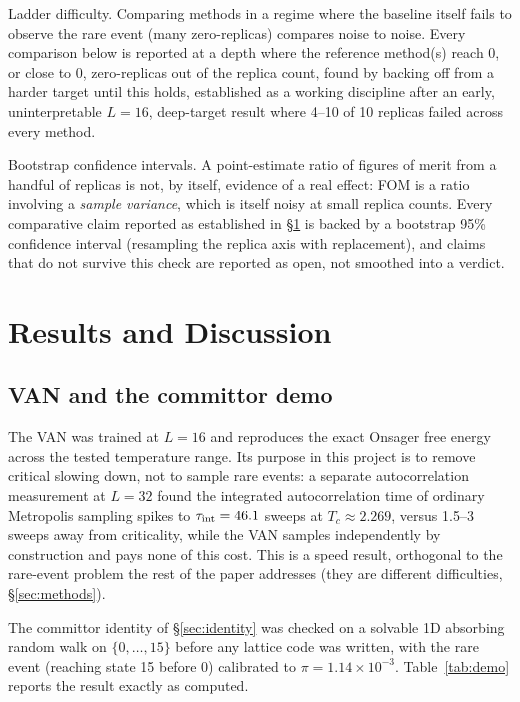 \documentclass[a4paper,fleqn]{cas-sc}
\begin{document}
Ladder difficulty. Comparing methods in a regime where the baseline itself fails
to observe the rare event (many zero-replicas) compares noise to noise. Every comparison
below is reported at a depth where the reference method(s) reach 0, or close to 0,
zero-replicas out of the replica count, found by backing off from a harder target until
this holds, established as a working discipline after an early, uninterpretable
$L=16$, deep-target result where 4--10 of 10 replicas failed across every method.

Bootstrap confidence intervals. A point-estimate ratio of figures of merit from a
handful of replicas is not, by itself, evidence of a real effect: FOM is a ratio
involving a \emph{sample variance}, which is itself noisy at small replica counts. Every
comparative claim reported as established in \S\ref{sec:results} is backed by a bootstrap
95\% confidence interval (resampling the replica axis with replacement), and claims that do
not survive this check are reported as open, not smoothed into a verdict.

\FloatBarrier

\section{Results and Discussion}\label{sec:results}

\subsection{VAN and the committor demo}\label{sec:res-van}
The VAN was trained at $L=16$ and reproduces the exact Onsager free energy across the
tested temperature range. Its purpose in this project is to remove critical slowing down,
not to sample rare events: a separate autocorrelation measurement at $L=32$ found the
integrated autocorrelation time of ordinary Metropolis sampling spikes to $\tau_{\rm
	int}=46.1$ sweeps at $T_c\approx2.269$, versus 1.5--3 sweeps away from criticality, while
the VAN samples independently by construction and pays none of this cost. This is a speed
result, orthogonal to the rare-event problem the rest of the paper addresses (they are
different difficulties, \S\ref{sec:methods}).

The committor identity of \S\ref{sec:identity} was checked on a solvable 1D absorbing
random walk on $\{0,\dots,15\}$ before any lattice code was written, with the rare event
(reaching state 15 before 0) calibrated to $\pi=1.14\times10^{-3}$. Table~\ref{tab:demo}
reports the result exactly as computed.
\end{document}
